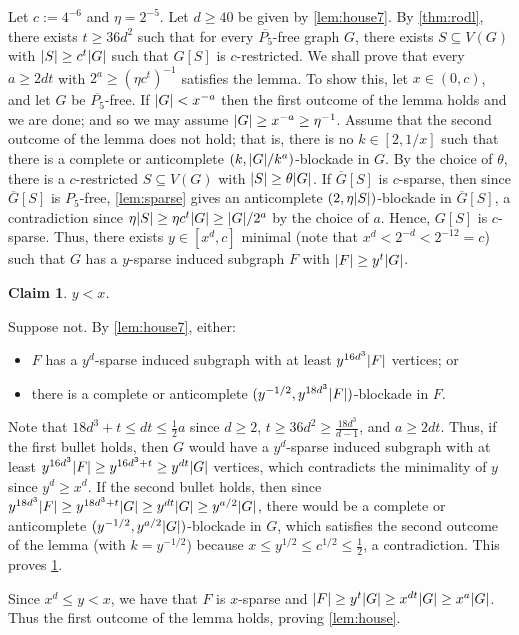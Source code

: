 \documentclass[11pt,reqno,a4paper]{amsart}
\newtheorem{claim}{Claim}[theorem]
\let\oldendproof\endproof
\renewenvironment{proof}[1][\proofname]{%
	\oldproof[\normalfont\bfseries #1]%
}{\oldendproof}
\renewcommand{\qedsymbol}{$\blacksquare$}%
\newenvironment{subproof}[1][\normalfont\it Subproof]{%
	\renewcommand{\qedsymbol}{$\square$}%
	\begin{proof}[#1]%
	}{%
	\end{proof}%
}
\renewcommand{\subset}{\subseteq}
\DeclarePairedDelimiter\abs{\lvert}{\rvert}%
\begin{document}
	\begin{proof}
		Let $c:=4^{-6}$ and $\eta=2^{-5}$.
		Let $d\ge40$ be given by \cref{lem:house7}.
		By \cref{thm:rodl}, there exists $t\ge 36d^2$ such that for every $\overline{P_5}$-free graph $G$, there exists $S\subset V(G)$ with $\abs S\ge c^t\abs G$ such that $G[S]$ is $c$-restricted.
		We shall prove that every $a\ge2dt$ with $2^{a}\ge(\eta c^t)^{-1}$ satisfies the lemma.
		To show this, let $x\in(0,c)$, and let $G$ be $\overline{P_5}$-free.
		If $\abs G<x^{-a}$ then the first outcome of the lemma holds and we are done;
		and so we may assume $\abs G\ge x^{-a}\ge\eta^{-1}$.
		Assume that the second outcome of the lemma does not hold; that is, there is no $k\in[2,1/x]$ such that there is a complete or anticomplete $(k,\abs G/k^a)$-blockade in $G$.
		By the choice of $\theta$, there is a $c$-restricted $S\subset V(G)$ with $\abs S\ge\theta\abs G$.
		If $\overline G[S]$ is $c$-sparse, then since $\overline G[S]$ is $P_5$-free, \cref{lem:sparse} gives an anticomplete $(2,{\eta\abs S})$-blockade in $\overline G[S]$,
		a contradiction since ${\eta\abs S}\ge {\eta c^t\abs G}\ge \abs G/2^a$ by the choice of $a$.
		Hence, $G[S]$ is $c$-sparse.
		Thus, there exists $y\in[x^d,c]$ minimal (note that $x^d< 2^{-d}<2^{-12}=c$) such that $G$ has a $y$-sparse induced subgraph $F$ with $\abs F\ge y^{t}\abs G$.
		\begin{claim}
			\label{claim:decre}
			$y<x$.
		\end{claim}
		\begin{subproof}
			Suppose not.
			By \cref{lem:house7}, either:
			\begin{itemize}
				\item $F$ has a $y^d$-sparse induced subgraph with at least $y^{16d^3}\abs F$ vertices; or
				
				\item there is a complete or anticomplete $(y^{-1/2},y^{18d^3}\abs F)$-blockade in $F$.
			\end{itemize}
			
			Note that $18d^3+t\le dt\le \frac12a$ since $d\ge2$, $t\ge 36d^2\ge \frac{18d^3}{d-1}$, and $a\ge2dt$.
			Thus, if the first bullet holds, then $G$ would have a $y^d$-sparse induced subgraph with at least $y^{16d^3}\abs F\ge y^{16d^3+t}\ge y^{dt}\abs G$ vertices,
			which contradicts the minimality of $y$ since $y^d\ge x^d$.
			If the second bullet holds, then since $y^{18d^3}\abs F\ge y^{18d^3+t}\abs G\ge y^{dt}\abs G\ge y^{a/2}\abs G$,
			there would be a complete or anticomplete $(y^{-1/2},y^{a/2}\abs G)$-blockade in $G$,
			which satisfies the second outcome of the lemma (with $k=y^{-1/2}$) because $x\le y^{1/2}\le c^{1/2}\le\frac12$, a contradiction.
			This proves \cref{claim:decre}.
		\end{subproof}
		
		Since $x^d\le y<x$, we have that $F$ is $x$-sparse and $\abs F\ge y^t\abs G\ge x^{dt}\abs G\ge x^a\abs G$.
		Thus the first outcome of the lemma holds, proving \cref{lem:house}.
	\end{proof}
\end{document}
